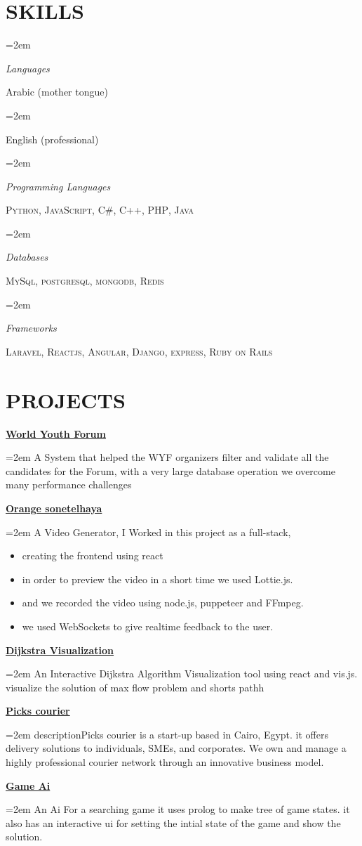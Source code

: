 \documentclass[paper=a4,fontsize=11pt]{scrartcl} %
\newlength{\spacebox}
\newcommand{\sepspace}{\vspace*{1em}}		%
\newcommand{\NewPart}[1]{\section*{\uppercase{#1}}}
\newcommand{\PersonalEntry}[2]{
		\noindent\hangindent=1em\hangafter=0 %
		\parbox{\spacebox}{        %
		\textit{#1}}		       %
		\hspace{1.5em} #2 \par}    %
\newcommand{\SkillsEntry}[2]{      %
		\noindent\hangindent=2em\hangafter=0 %
		\parbox{\spacebox}{        %
		\textit{#1}}			   %
		\hspace{1.5em} #2 \par}    %
\newcommand{\ProjectEntry}[2]{
		\noindent \textbf{#1} \hfill      %
		
		\noindent\hangindent=2em\hangafter=0 \small #2 %
		\normalsize \par}
\begin{document}
\NewPart{Skills}{
\SkillsEntry{Languages}{Arabic (mother tongue)}
\SkillsEntry{}{English (professional)}

\sepspace
\SkillsEntry{Programming Languages}{\textsc{Python}, \textsc{JavaScript},  \textsc{C\#}, \textsc{C++},  \textsc{PHP}, \textsc{Java}}
\sepspace


\SkillsEntry{Databases}{\textsc{MySql}, \textsc{postgresql}, \textsc{mongodb}, \textsc{Redis}}

\sepspace


\SkillsEntry{Frameworks}{\textsc{Laravel}, \textsc{Reactjs}, \textsc{Angular}, \textsc{Django}, \textsc{express}, \textsc{Ruby on Rails}}

}

\NewPart{projects}{
\ProjectEntry{\href{https://wyfegypt.com/}{World Youth Forum}}{A System that helped the WYF organizers filter and validate all the candidates for the Forum, with a very large database operation we overcome many performance challenges}
\ProjectEntry{\href{https://orange-sonetelhaya.com/}{Orange sonetelhaya}}{A Video Generator, I Worked in this project as a full-stack, 
\begin{itemize}
 \item creating the frontend using react
 \item in order to preview the video in a short time we used Lottie.js.
 \item and we recorded the video using node.js, puppeteer and FFmpeg.
 \item we used WebSockets to give realtime feedback to the user.
\end{itemize}
}
\ProjectEntry{\href{https://react-dijkstra.now.sh}{Dijkstra Visualization}}{
An Interactive Dijkstra Algorithm Visualization tool using react and vis.js. visualize the solution of max flow problem and shorts pathh
}

\ProjectEntry{\href{http://pickscourier.com}{Picks courier}}{
descriptionPicks courier is a start-up based in Cairo, Egypt. it offers delivery solutions to individuals, SMEs, and corporates. We own and manage a highly professional courier network through an innovative business model.}


\ProjectEntry{\href{https://github.com/peter44322/p5js-search}{Game Ai}}{An Ai For a searching game it uses prolog to make tree of game states. it also has an interactive ui for setting the intial state of the game and show the solution.}

}
\end{document}
